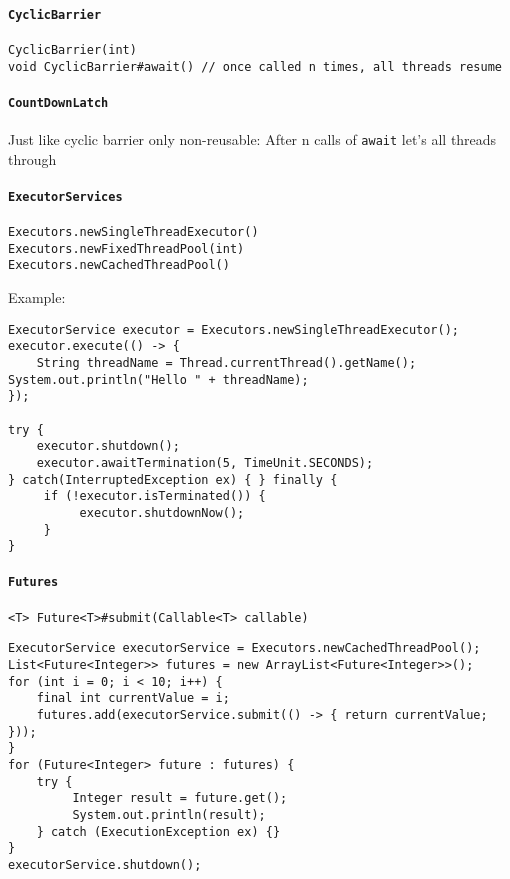 \paragraph{\texttt{CyclicBarrier}}
\begin{verbatim}
CyclicBarrier(int)
void CyclicBarrier#await() // once called n times, all threads resume
\end{verbatim}
\paragraph{\texttt{CountDownLatch}}
Just like cyclic barrier only non-reusable: After n calls of \texttt{await} let's all threads through

\paragraph{\texttt{ExecutorServices}}
\begin{verbatim}
Executors.newSingleThreadExecutor()
Executors.newFixedThreadPool(int)
Executors.newCachedThreadPool()
\end{verbatim}
Example:
\begin{verbatim}
ExecutorService executor = Executors.newSingleThreadExecutor(); executor.execute(() -> {
    String threadName = Thread.currentThread().getName(); System.out.println("Hello " + threadName);
});

try {
    executor.shutdown();
    executor.awaitTermination(5, TimeUnit.SECONDS);
} catch(InterruptedException ex) { } finally {
     if (!executor.isTerminated()) {
          executor.shutdownNow();
     } 
}
\end{verbatim}
\paragraph{\texttt{Futures}}
\begin{verbatim}
<T> Future<T>#submit(Callable<T> callable)
\end{verbatim}
 
\begin{verbatim}
ExecutorService executorService = Executors.newCachedThreadPool(); 
List<Future<Integer>> futures = new ArrayList<Future<Integer>>(); 
for (int i = 0; i < 10; i++) {
    final int currentValue = i;
    futures.add(executorService.submit(() -> { return currentValue; }));
}
for (Future<Integer> future : futures) { 
    try {
         Integer result = future.get();
         System.out.println(result);
    } catch (ExecutionException ex) {}
} 
executorService.shutdown();
\end{verbatim}

